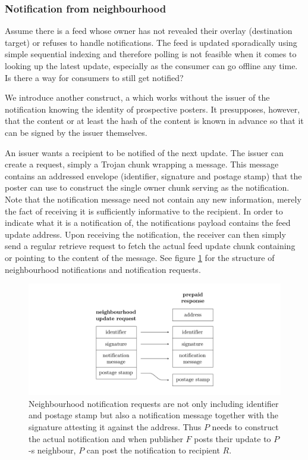\subsubsection{Notification from neighbourhood}

Assume there is a feed whose owner has not revealed their overlay (destination target) or refuses to handle notifications.  The feed is updated sporadically using simple sequential indexing and therefore polling is not feasible when it comes to looking up the latest update, especially as the consumer can go offline any time.
Is there a way for consumers to still get notified? 

We introduce another construct, a  which works without the issuer of the notification knowing the identity of prospective posters. It presupposes, however, that the content or at least the hash of the content is known in advance so that it can be signed by the issuer themselves.


An issuer wants a recipient to be notified of the next update. The issuer can create a  request, simply a Trojan chunk wrapping a message. This message contains an addressed envelope (identifier, signature and postage stamp) that the poster can use to construct the single owner chunk serving as the notification. Note that the notification message need not contain any new information, merely the fact of receiving it is sufficiently informative to the recipient. In order to indicate what it is a notification of, the notifications payload contains the feed update address. Upon receiving the notification, the receiver can then simply send a regular retrieve request to fetch the actual feed update chunk containing or pointing to the content of the message. See figure \ref{fig:notification-from-neighbourhood} for the structure of neighbourhood notifications and notification requests.
                                

\begin{figure}[htbp]
\centering
\includegraphics[width=\textwidth]{fig/notification-from-neighbourhood.pdf}
\caption[Neighbourhood notifications \statusgreen]{Neighbourhood notification requests are not only including identifier and postage stamp but also a notification message together with the signature attesting it against the address. Thus $P$ needs to construct the actual notification and when publisher $F$ posts their update to $P$-s neighbour, $P$ can post the notification to recipient $R$.}
\label{fig:notification-from-neighbourhood}
\end{figure}

